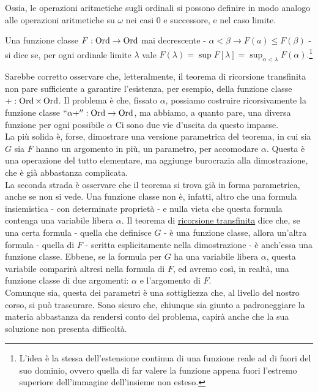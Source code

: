 Ossia, le operazioni aritmetiche sugli ordinali si possono definire in modo analogo alle operazioni aritmetiche su $\omega$ nei casi 0 e successore,
e  nel caso limite.

\begin{definition}[Continuità]
	Una funzione classe $F : \operatorname{Ord} \rightarrow \operatorname{Ord}$ mai decrescente - $\alpha < \beta \rightarrow F(a) \leq F(\beta)$ - si dice  se, per ogni ordinale limite $\lambda$ vale $F(\lambda) = \sup F[\lambda] = \sup_{\alpha < \lambda} F(\alpha)$.\footnote{L'idea è la stessa dell'estensione continua di una funzione reale ad di fuori del suo dominio, ovvero quella 
	di far valere la funzione appena fuori l'estremo superiore dell'immagine dell'insieme non esteso.}
\end{definition}

\begin{note}
	Sarebbe corretto osservare che, letteralmente, il teorema di ricorsione transfinita non pare sufficiente a garantire l'esistenza, per esempio, della funzione classe $+ : \operatorname{Ord} \times \operatorname{Ord}$.
	Il problema è che, fissato $\alpha$, possiamo costruire ricorsivamente la funzione classe $``\alpha+'' : \operatorname{Ord} \rightarrow \operatorname{Ord}$, ma abbiamo, a quanto pare, una diversa funzione per ogni possibile $\alpha$
	Ci sono due vie d'uscita da questo impasse.\\
	La più solida è, forse, dimostrare una versione parametrica del teorema, in cui sia $G$ sia $F$ hanno un argomento in più, un parametro, per accomodare $\alpha$.
	Questa è una operazione del tutto elementare, ma aggiunge burocrazia alla dimostrazione, che è già abbastanza complicata.\\
	La seconda strada è osservare che il teorema si trova già in forma parametrica, anche se non si vede. Una funzione classe non è, infatti, altro che una formula insiemistica - con determinate proprietà - e nulla vieta 
	che questa formula contenga una variabile libera $\alpha$. Il teorema di \hyperref[ric_transf1]{ricorsione transfinita} dice che, se una certa formula - quella che definisce $G$ - è una funzione classe, allora un'altra formula - quella di $F$ - scritta esplicitamente nella 
	dimostrazione - è anch'essa una funzione classe. Ebbene, se la formula per $G$ ha una variabile libera $\alpha$, questa variabile comparirà altresì nella formula di $F$, ed avremo così, in realtà, una funzione classe di due argomenti: $\alpha$ e l'argomento di $F$.\\
	Comunque sia, questa dei parametri è una sottigliezza che, al livello del nostro corso, si può trascurare. Sono sicuro che, chiunque sia giunto a padroneggiare la materia abbastanza da rendersi conto del problema, capirà anche che la sua soluzione 
	non presenta difficoltà.
\end{note}

